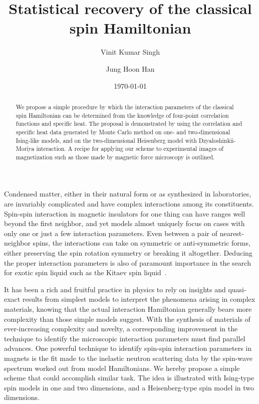 \documentclass[reprint,amsmath,amssymb,aps,showpacs,superscriptaddress,prb]{revtex4-1}
\begin{document}
%
\title{Statistical recovery of the classical spin Hamiltonian}

\author{Vinit Kumar Singh}
\author{Jung Hoon Han}
\date{\today}

\begin{abstract} We propose a simple procedure by which the interaction parameters of the classical spin Hamiltonian can be determined from the knowledge of four-point correlation functions and specific heat. The proposal is demonstrated by using the correlation and specific heat data generated by Monte Carlo method on one- and two-dimensional Ising-like models, and on the two-dimensional Heisenberg model with Dzyaloshinkii-Moriya interaction. A recipe for applying our scheme to experimental images of magnetization such as those made by magnetic force microscopy is outlined.
\end{abstract}
\maketitle

Condensed matter, either in their natural form or as synthesized in laboratories, are invariably complicated and have complex interactions among its constituents. Spin-spin interaction in magnetic insulators for one thing can have ranges well beyond the first neighbor, and yet models almost uniquely focus on cases with only one or just a few interaction parameters. Even between a pair of nearest-neighbor spins, the interactions can take on symmetric or anti-symmetric forms, either preserving the spin rotation symmetry or breaking it altogether. Deducing the proper interaction parameters is also of paramount importance in the search for exotic spin liquid such as the Kitaev spin liquid~\cite{kitaev}.

It has been a rich and fruitful practice in physics to rely on insights and quasi-exact results from simplest models to interpret the phenomena arising in complex materials, knowing that the actual interaction Hamiltonian generally bears more complexity than those simple models suggest. With the synthesis of materials of ever-increasing complexity and novelty, a corresponding improvement in the technique to identify the microscopic interaction parameters must find parallel advances. One powerful technique to identify spin-spin interaction parameters in magnets is the fit made to the inelastic neutron scattering data by the spin-wave spectrum worked out from model Hamiltonians. We hereby propose a simple scheme that could accomplish similar task. The idea is illustrated with Ising-type spin models in one and two dimensions, and a Heisenberg-type spin model in two dimensions.
\end{document}
